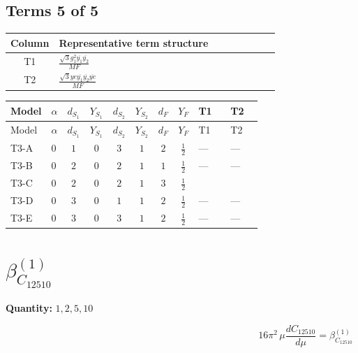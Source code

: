 \documentclass[8pt]{article}
\begin{document}
\begin{landscape}
\subsection*{Terms 5 of 5}
\begin{center}
\begin{tabular}{@{}c >{\raggedright\arraybackslash}p{0.82\linewidth}@{}}
\toprule
Column & Representative term structure \\
\midrule
T1 & \(\displaystyle \frac{\sqrt{3} g_{1}^{2} \overline{y_{1}} \overline{y_{2}}}{MF}\) \\
\midrule
T2 & \(\displaystyle \frac{\sqrt{3} ye \overline{y_{1}} \overline{y_{2}} \overline{ye}}{MF}\) \\
\midrule
\bottomrule
\end{tabular}
\end{center}
\smallskip
\tiny
\begin{longtable}{@{}llcccccc >{\raggedright\arraybackslash}p{0.21\linewidth} >{\raggedright\arraybackslash}p{0.21\linewidth}@{}}
\toprule
Model & $\alpha$ & $d_{S_1}$ & $Y_{S_1}$ & $d_{S_2}$ & $Y_{S_2}$ & $d_F$ & $Y_F$ & T1 & T2 \\
\midrule
\endfirsthead
\toprule
Model & $\alpha$ & $d_{S_1}$ & $Y_{S_1}$ & $d_{S_2}$ & $Y_{S_2}$ & $d_F$ & $Y_F$ & T1 & T2 \\
\midrule
\endhead
T3-A & $0$ & $1$ & $0$ & $3$ & $1$ & $2$ & $\frac{1}{2}$ & --- & --- \\
\midrule
T3-B & $0$ & $2$ & $0$ & $2$ & $1$ & $1$ & $\frac{1}{2}$ & --- & --- \\
\midrule
T3-C & $0$ & $2$ & $0$ & $2$ & $1$ & $3$ & $\frac{1}{2}$ & \scriptsize\adjustbox{max width=\linewidth}{$\begin{gathered} - \frac{\sqrt{3} g_{1}^{2} \overline{y_{1}} \overline{y_{2}}}{16 MF}\end{gathered}$} & \scriptsize\adjustbox{max width=\linewidth}{$\begin{gathered} \frac{\sqrt{3} ye \overline{y_{1}} \overline{y_{2}} \overline{ye}}{24 MF}\end{gathered}$} \\
\midrule
T3-D & $0$ & $3$ & $0$ & $1$ & $1$ & $2$ & $\frac{1}{2}$ & --- & --- \\
\midrule
T3-E & $0$ & $3$ & $0$ & $3$ & $1$ & $2$ & $\frac{1}{2}$ & --- & --- \\
\midrule
\bottomrule
\end{longtable}
\clearpage
\section*{$\beta_{C_{12510}}^{(1)}$}
\noindent\textbf{Quantity: }$\mathrm{1,2,5,10}$\par\smallskip
\[16\pi^2\,\mu\frac{d C_{12510}}{d\mu}=\beta_{C_{12510}}^{(1)}\]

\end{landscape}
\end{document}
